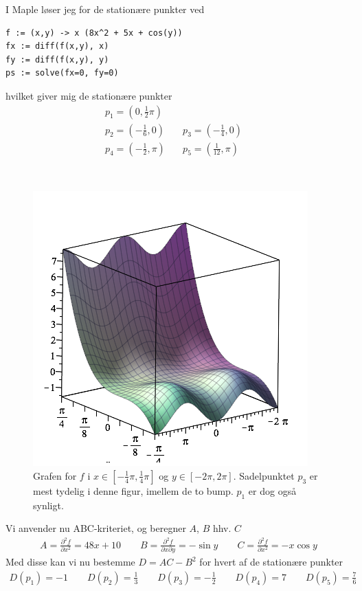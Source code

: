 \documentclass[11pt,a4paper]{article}
\newcommand{\colbreak}{\vfill{\ }\columnbreak}
\newcommand{\half}{\frac{1}{2}}
\begin{document}
\begin{multicols}{2}
I Maple løser jeg for de stationære punkter ved

\begin{lstlisting}
f := (x,y) -> x (8x^2 + 5x + cos(y))
fx := diff(f(x,y), x)
fy := diff(f(x,y), y)
ps := solve(fx=0, fy=0)
\end{lstlisting}

hvilket giver mig de stationære punkter
\begin{align*}
    p_1 = \left( 0, \half \pi \right) &\quad \\
    p_2 = \left( -\frac{1}{6}, 0 \right) &\quad
    p_3 = \left( -\frac{1}{4}, 0 \right) \quad \\
    p_4 = \left( -\half, \pi \right) &\quad
    p_5 = \left( \frac{1}{12}, \pi \right)
\end{align*}

\colbreak

\begin{figure}[H]
    \centering
    \includegraphics[scale=0.4]{figures/8-1-sadel.png}
    \caption{Grafen for $f$ i $x \in [-\frac{1}{4}\pi,\frac{1}{4}\pi]$ og
    $y \in [-2\pi,2\pi]$. Sadelpunktet $p_3$ er mest tydelig i denne figur,
    imellem de to bump. $p_1$ er dog også synligt.}
    \label{fig:8.1-sadel}
\end{figure}

\end{multicols}

Vi anvender nu ABC-kriteriet, og beregner $A$, $B$ hhv. $C$
\begin{align}
    A = \frac{\partial^2 f}{\partial x^2} = 48x + 10
    \qquad
    B = \frac{\partial^2 f}{\partial x \partial y} = -\sin y
    \qquad
    C = \frac{\partial^2 f}{\partial x^2} = -x \cos y
\end{align}
Med disse kan vi nu bestemme $D = AC - B^2$ for hvert af de stationære
punkter
\begin{align}
    D(p_1) = -1 \qquad
    D(p_2) = \frac{1}{3} \qquad
    D(p_3) = -\half \qquad
    D(p_4) = 7 \qquad
    D(p_5) = \frac{7}{6}
\end{align}
\end{document}
